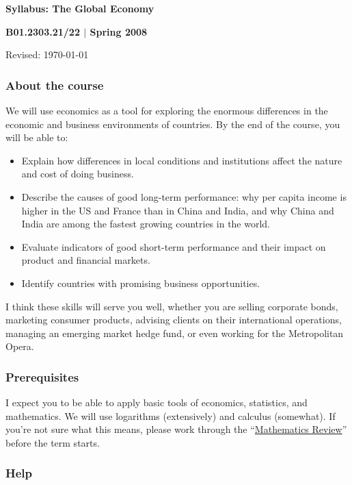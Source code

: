 \documentclass[letterpaper,12pt]{article}
\begin{document}
\thispagestyle{empty}%
\Head
\centerline{\large\bf Syllabus:  The Global Economy} 
\vspace{1mm}
\centerline{\large\bf B01.2303.21/22 $|$ Spring 2008}
\vspace{1mm}
\centerline{Revised:  \today}


\subsubsection*{About the course}

We will use economics as a tool for exploring the enormous 
differences in the economic and business environments of 
countries. By the end of the course, you will be able to:
%
\begin{itemize}
\item Explain how differences in local conditions 
and institutions 
affect the nature and cost of doing business.   

\item Describe the causes of good long-term performance: why per
capita income is higher in the US and France than in China and India, 
and why China and India are among the fastest growing countries in the 
world.  

\item Evaluate indicators of good short-term performance
and their impact on product and financial markets.  

\item Identify countries with promising business opportunities.   

\end{itemize}
%
I think these skills will serve you well, whether you are selling
corporate bonds, 
marketing consumer products, 
advising clients on their international operations, 
managing an emerging market hedge fund,
or even working for the Metropolitan Opera.


\subsubsection*{Prerequisites}

I expect you to be able to apply basic tools of economics,
statistics, and mathematics.  We will use 
logarithms (extensively) and calculus (somewhat). 
If you're not sure what this means, 
please work through the 
``\href{http://www.stern.nyu.edu/eco/b012303/Backus/notes_math.pdf}
{Mathematics Review}''
before the term starts.   


\subsubsection*{Help} 
\end{document}
